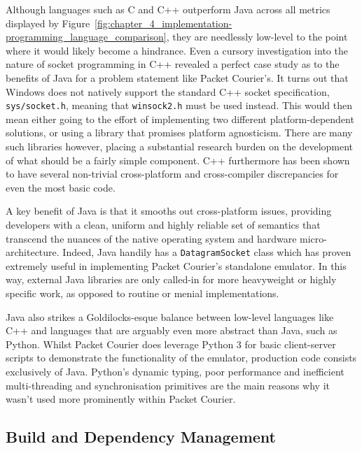 Although languages such as C and C++ outperform Java across all metrics displayed by
Figure~\ref{fig:chapter_4_implementation-programming_language_comparison}, they are needlessly low-level to the point
where it would likely become a hindrance. Even a cursory investigation into the nature of socket programming in C++
revealed a perfect case study as to the benefits of Java for a problem statement like Packet Courier's. It turns out
that Windows does not natively support the standard C++ socket specification, \texttt{sys/socket.h}, meaning that
\texttt{winsock2.h} must be used instead\cite{socket_vs_winsock}. This would then mean either going to the effort of
implementing two different platform-dependent solutions, or using a library that promises platform agnosticism. There
are many such libraries however\cite{c++_socket_libraries}, placing a substantial research burden on the development
of what should be a fairly simple component. C++ furthermore has been shown to have several non-trivial cross-platform
and cross-compiler discrepancies for even the most basic code\cite{c++_cross_compiler_differences,
    c++_statistical_differences, c++_random_differences, c++_filesystem_differences}.

A key benefit of Java is that it smooths out cross-platform issues, providing developers with a clean, uniform and
highly reliable set of semantics that transcend the nuances of the native operating system and hardware
micro-architecture. Indeed, Java handily has a \texttt{DatagramSocket} class\cite{java_DatagramSocket} which has
proven extremely useful in implementing Packet Courier's standalone emulator. In this way, external Java libraries
are only called-in for more heavyweight or highly specific work, as opposed to routine or menial implementations.

Java also strikes a Goldilocks-esque balance\cite{goldilocks_effect} between low-level languages like C++ and
languages that are arguably even more abstract than Java, such as Python. Whilst Packet Courier does leverage Python
3\cite{python_3} for basic client-server scripts to demonstrate the functionality of the emulator, production code
consists exclusively of Java. Python's dynamic typing\cite{python_typing}, poor
performance\cite{programming_language_efficiency} and inefficient multi-threading and synchronisation
primitives\cite{python_gil} are the main reasons why it wasn't used more prominently within Packet Courier.

\subsection{Build and Dependency Management}\label{subsection:build_and_dependency_management}

